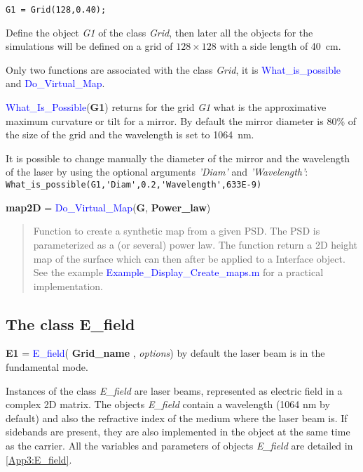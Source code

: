 \begin{verbatim}
G1 = Grid(128,0.40);
\end{verbatim}

Define the object \textsl{G1} of the class \textsl{Grid}, then later all the objects for the simulations will be defined on a grid of $128 \times 128$ with a side length of 40~cm.

Only two functions are associated with the class \textsl{Grid}, it is \textcolor{blue}{What\_is\_possible} and \textcolor{blue}{Do\_Virtual\_Map}.

\textcolor{blue}{What\_Is\_Possible}(\textbf{G1}) returns for the grid \textsl{G1} what is the approximative maximum curvature or tilt for a mirror. By default the mirror diameter is 80\% of the size of the grid and the wavelength is set to 1064~nm.

It is possible to change manually the diameter of the mirror and the wavelength of the laser by using the optional arguments \emph{'Diam'} and \emph{'Wavelength'}: \verb? What_is_possible(G1,'Diam',0.2,'Wavelength',633E-9) ?

\noindent \textbf{map2D} = \textcolor{blue}{Do\_Virtual\_Map}(\textbf{G}, \textbf{Power\_law})
\vspace*{-0.2cm}
\begin{quote}
Function to create a synthetic map from a given PSD. The PSD is parameterized as a (or several) power law. The function return a 2D height map of the surface which can then after be applied to a Interface object. See the example \textcolor{blue}{Example\_Display\_Create\_maps.m} for a practical implementation.
\end{quote}


\subsection{The class E\_field}
\textbf{E1} = \textcolor{blue}{E\_field}( \textbf{Grid\_name} , \emph{options}) by default the laser beam is in the fundamental mode.

Instances of the class \textsl{E\_field} are laser beams, represented as electric field in a complex 2D matrix. The objects \textsl{E\_field} contain a wavelength (1064 nm by default) and also the refractive index of the medium where the laser beam is. If sidebands are present, they are also implemented in the object at the same time as the carrier. All the variables and parameters of objects \textsl{E\_field} are detailed in \ref{App3:E_field}.

